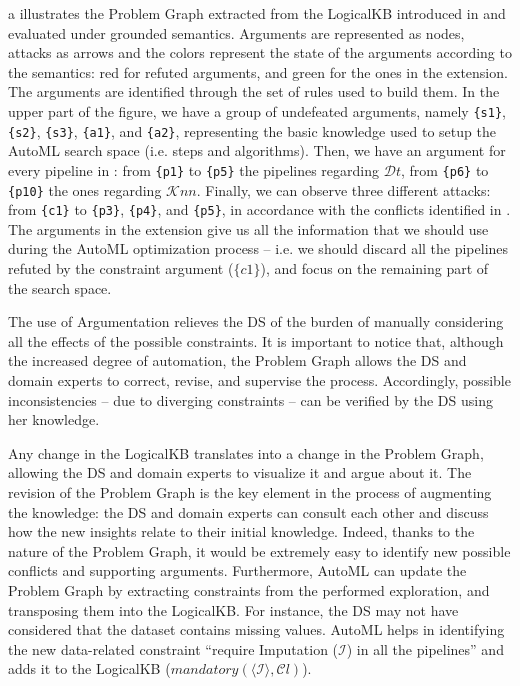 \begin{example}
a illustrates the Problem Graph extracted from the LogicalKB introduced in  and evaluated under grounded semantics.
Arguments are represented as nodes, attacks as arrows and the colors represent the state of the arguments according to the semantics: red for refuted arguments, and green for the ones in the extension.
The arguments are identified through the set of rules used to build them.
In the upper part of the figure, we have a group of undefeated arguments, namely \texttt{\{s1\}}, \texttt{\{s2\}}, \texttt{\{s3\}}, \texttt{\{a1\}}, and \texttt{\{a2\}}, representing the basic knowledge used to setup the AutoML search space (i.e. steps and algorithms).
Then, we have an argument for every pipeline in : from \texttt{\{p1\}} to \texttt{\{p5\}} the pipelines regarding $\mathcal{D}t$, from \texttt{\{p6\}} to \texttt{\{p10\}} the ones regarding $\mathcal{K}nn$.
Finally, we can observe three different attacks: from \texttt{\{c1\}} to \texttt{\{p3\}}, \texttt{\{p4\}}, and \texttt{\{p5\}}, in accordance with the conflicts identified in .
The arguments in the extension give us all the information that we should use during the AutoML optimization process -- i.e. we should discard all the pipelines refuted by the constraint argument ($\{c1\}$), and focus on the remaining part of the search space.
\label{ex:graph}
\end{example}

The use of Argumentation relieves the DS of the burden of manually considering all the effects of the possible constraints.
It is important to notice that, although the increased degree of automation, the Problem Graph allows the DS and domain experts to correct, revise, and supervise the process.
Accordingly, possible inconsistencies -- due to diverging constraints -- can be verified by the DS using her knowledge.

Any change in the LogicalKB translates into a change in the Problem Graph, allowing the DS and domain experts to visualize it and argue about it.
The revision of the Problem Graph is the key element in the process of augmenting the knowledge: the DS and domain experts can consult each other and discuss how the new insights relate to their initial knowledge.
Indeed, thanks to the nature of the Problem Graph, it would be extremely easy to identify new possible conflicts and supporting arguments.
Furthermore, AutoML can update the Problem Graph by extracting constraints from the performed exploration, and transposing them into the LogicalKB.
For instance, the DS may not have considered that the dataset contains missing values.
AutoML helps in identifying the new data-related constraint ``require Imputation ($\mathcal{I}$) in all the pipelines'' and adds it to the LogicalKB ($mandatory(\langle \mathcal{I} \rangle, \mathcal{C}l)$).

